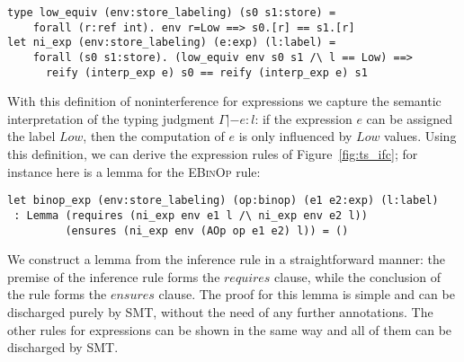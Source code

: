 \documentclass[sigplan,screen]{acmart}\settopmatter{}
\newcommand{\comm}[3]{\ifcheckpagebudget\else\ifdraft{\maybecolor{#1}[#2: #3]}\fi\fi}
\newcommand{\nig}[1]{\comm{dkgreen}{Niklas}{#1}}
\newcommand{\km}[1]{\comm{purple}{KM}{#1}}
\begin{document}
\begin{lstlisting}
type low_equiv (env:store_labeling) (s0 s1:store) =
    forall (r:ref int). env r=Low ==> s0.[r] == s1.[r]
let ni_exp (env:store_labeling) (e:exp) (l:label) =
    forall (s0 s1:store). (low_equiv env s0 s1 /\ l == Low) ==> 
      reify (interp_exp e) s0 == reify (interp_exp e) s1
\end{lstlisting}





With this definition of noninterference for expressions we capture
the semantic interpretation of the typing judgment
$\Gamma |- e : l$: if the expression $e$ can be assigned the label \ls$Low$, 
then the computation of $e$ is only influenced by \ls$Low$ values.
%
\iffull
Using this definition, we can derive the expression rules of
Figure~\ref{fig:ts_ifc}; for instance here is a lemma for the \textsc{EBinOp} rule:

\begin{lstlisting}
let binop_exp (env:store_labeling) (op:binop) (e1 e2:exp) (l:label)
 : Lemma (requires (ni_exp env e1 l /\ ni_exp env e2 l)) 
         (ensures (ni_exp env (AOp op e1 e2) l)) = ()
\end{lstlisting}

We construct a lemma from the inference rule in a straightforward
manner: the premise of the inference rule forms the \ls$requires$
clause, while the conclusion of the rule forms the \ls$ensures$ clause.
The proof for this lemma is simple and can be discharged
purely by SMT, without the need of any further annotations. The other
rules for expressions can be shown in the same way and all of them can
be discharged by SMT.
\fi
\end{document}
